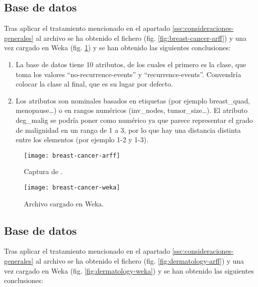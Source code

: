 \subsection{Base de datos }
Tras aplicar el tratamiento mencionado en el apartado \ref{ssc:consideraciones-generales} al archivo  se ha obtenido el fichero  (fig. \ref{fig:breast-cancer-arff}) y una vez cargado en Weka (fig. \ref{fig:breast-cancer-weka}) y se han obtenido las siguientes conclusiones:

\begin{enumerate}
    \item La base de datos tiene 10 atributos, de los cuales el primero es la clase, que toma los valores ``no-recurrence-events'' y ``recurrence-events''. Convendría colocar la clase al final, que es su lugar por defecto.
    \item Los atributos son nominales basados en etiquetas (por ejemplo breast\_quad, menopause\dots) o en rangos numéricos (inv\_nodes, tumor\_size\dots). El atributo deg\_malig se podría poner como numérico ya que parece representar el grado de malignidad en un rango de 1 a 3, por lo que hay una distancia distinta entre los elementos (por ejemplo 1-2 y 1-3).
\end{enumerate}

\begin{figure}[H]
    \centering
    \begin{minipage}{0.49\textwidth}
        \centering
        \texttt{[image: breast-cancer-arff]}
        \caption{Captura de .}
        \label{fig:breast-cancer-arff}
    \end{minipage}
    \begin{minipage}{0.49\textwidth}
        \centering
        \texttt{[image: breast-cancer-weka]}
        \caption{Archivo  cargado en Weka.}
        \label{fig:breast-cancer-weka}
    \end{minipage}
\end{figure}

\subsection{Base de datos }
Tras aplicar el tratamiento mencionado en el apartado \ref{ssc:consideraciones-generales} al archivo  se ha obtenido el fichero  (fig. \ref{fig:dermatology-arff}) y una vez cargado en Weka (fig. \ref{fig:dermatology-weka}) y se han obtenido las siguientes conclusiones:


